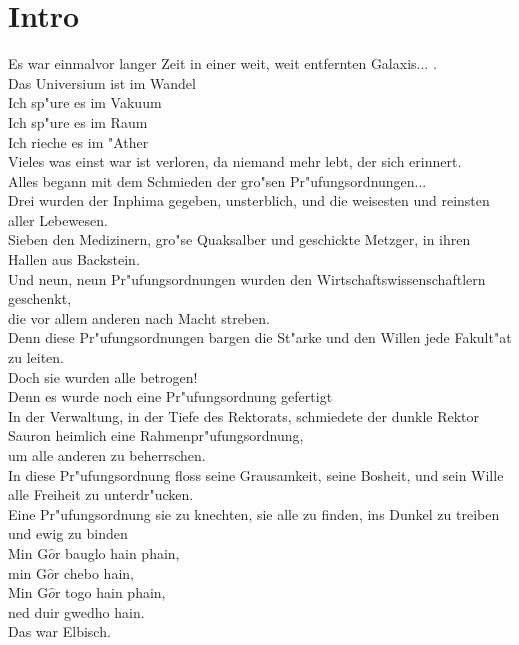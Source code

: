 %
%
\newpage
\section{Intro}
  \label{sec:intro}
    \sound{}
    \licht{}
    \requisiten{}
Es war einmalvor langer Zeit in einer weit, weit entfernten Galaxis... .\\
Das Universium ist im Wandel\\
Ich sp"ure es im Vakuum \\
Ich sp"ure es im Raum\\
Ich rieche es im "Ather\\
Vieles was einst war ist verloren, da niemand mehr lebt, der sich erinnert.\\
Alles begann mit dem Schmieden der gro"sen Pr"ufungsordnungen...\\
Drei wurden der Inphima gegeben, unsterblich, und die weisesten und reinsten aller Lebewesen.\\
Sieben den Medizinern, gro"se Quaksalber und geschickte Metzger, in ihren Hallen aus Backstein.\\
Und neun, neun Pr"ufungsordnungen wurden den Wirtschaftswissenschaftlern geschenkt,\\
die vor allem anderen nach Macht streben.\\
Denn diese Pr"ufungsordnungen bargen die St"arke und den Willen jede Fakult"at zu leiten.\\
Doch sie wurden alle betrogen!\\
Denn es wurde noch eine Pr"ufungsordnung gefertigt\\
In der Verwaltung, in der Tiefe des Rektorats, schmiedete der dunkle Rektor Sauron heimlich eine Rahmenpr"ufungsordnung,\\
um alle anderen zu beherrschen.\\
In diese Pr"ufungsordnung floss seine Grausamkeit, seine Bosheit, und sein Wille alle Freiheit zu unterdr"ucken.\\
Eine Pr"ufungsordnung sie zu knechten,
sie alle zu finden, 
ins Dunkel zu treiben 
und ewig zu binden\\
Min G$\hat{o}$r bauglo hain phain, \\
min G$\hat{o}$r chebo hain, \\
Min G$\hat{o}$r togo hain phain, \\
ned duir gwedho hain.\\
 Das war Elbisch.\\
%